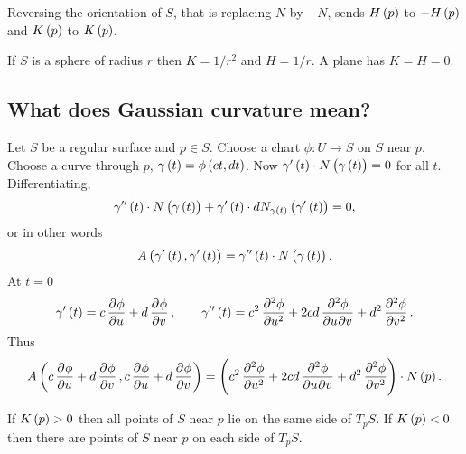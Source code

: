 Reversing the orientation of $ S $, that is replacing $ N $ by $ -N $, sends $ H\br{p} $ to $ -H\br{p} $ and $ K\br{p} $ to $ K\br{p} $.

\begin{example*}
If $ S $ is a sphere of radius $ r $ then $ K = 1 / r^2 $ and $ H = 1 / r $. A plane has $ K = H = 0 $.
\end{example*}

\pagebreak

\subsection{What does Gaussian curvature mean?}

Let $ S $ be a regular surface and $ p \in S $. Choose a chart $ \phi : U \to S $ on $ S $ near $ p $. Choose a curve through $ p $, $ \gamma\br{t} = \phi\br{ct, dt} $. Now $ \gamma'\br{t} \cdot N\br{\gamma\br{t}} = 0 $ for all $ t $. Differentiating,
$$ \gamma''\br{t} \cdot N\br{\gamma\br{t}} + \gamma'\br{t} \cdot dN_{\gamma\br{t}}\br{\gamma'\br{t}} = 0, $$
or in other words
$$ A\br{\gamma'\br{t}, \gamma'\br{t}} = \gamma''\br{t} \cdot N\br{\gamma\br{t}}. $$
At $ t = 0 $
$$ \gamma'\br{t} = c\dpd{\phi}{u} + d\dpd{\phi}{v}, \qquad \gamma''\br{t} = c^2\dpd[2]{\phi}{u} + 2cd\dmd{\phi}{2}{u}{}{v}{} + d^2\dpd[2]{\phi}{v}. $$
Thus
$$ A\br{c\dpd{\phi}{u} + d\dpd{\phi}{v}, c\dpd{\phi}{u} + d\dpd{\phi}{v}} = \br{c^2\dpd[2]{\phi}{u} + 2cd\dmd{\phi}{2}{u}{}{v}{} + d^2\dpd[2]{\phi}{v}} \cdot N\br{p}. $$

\begin{proposition}
If $ K\br{p} > 0 $ then all points of $ S $ near $ p $ lie on the same side of $ T_pS $. If $ K\br{p} < 0 $ then there are points of $ S $ near $ p $ on each side of $ T_pS $.
\end{proposition}

